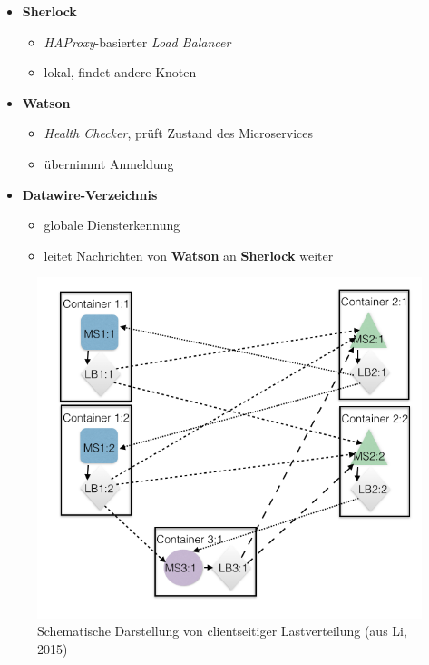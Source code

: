 \documentclass{beamer}
\begin{document}
\begin{frame}{\insertsubsection}
	\begin{itemize}[<+->]
		\setlength\itemsep{1em}
		\item \textbf{Sherlock} 
		\begin{itemize}
			\item \textit{HAProxy}-basierter \textit{Load Balancer}
			\item lokal, findet andere Knoten
		\end{itemize}
		\item \textbf{Watson} 
		\begin{itemize}
			\item \textit{Health Checker}, prüft Zustand des Microservices 
			\item übernimmt Anmeldung
		\end{itemize}
		\item \textbf{Datawire-Verzeichnis} 
		\begin{itemize}
			\item globale Diensterkennung
			\item leitet Nachrichten von \textbf{Watson} an \textbf{Sherlock} weiter
		\end{itemize}
	\end{itemize}
	\vfill
	\hfill{\footnotesize\cite{Li15}}
\end{frame}

\begin{frame}{\insertsubsection}
	\begin{figure}
		\centering
		\includegraphics[width=.65\linewidth]{img/clientloadbal}
		\caption{Schematische Darstellung von clientseitiger Lastverteilung (aus Li, 2015)}
		\label{fig:clientseitige_lastverteilung}
	\end{figure}
\end{frame}
\end{document}
